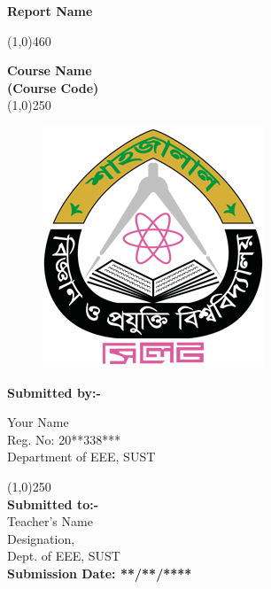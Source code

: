 \begin{titlepage}
	\begin{center}
	 \begin{Large}
	 \textbf{Report Name}
	 \end{Large}
	 \line(1,0){460}\\[5mm]
	 \begin{large} \textbf{ Course Name\\
	 (Course Code)}\\
	 	\line(1,0){250}
	 	\\[10mm]
	 \end{large}
	\end{center}
	

\begin{figure}[h]
\begin{center}
\includegraphics[scale=2.5]{logo/SUST_Logo.png}
\end{center}
\end{figure}

	\begin{center}
	\begin{large}
	
	\textbf{Submitted by:-}\\
\begin{center}
	 Your Name\\
	 Reg. No: 20**338***\\
	 Department of EEE, SUST\\
	[.3in]
\end{center}
	
	
	
	\line(1,0){250}
	\\[.5cm]
	\textbf{Submitted to:-}\\
	Teacher's Name\\
	Designation,\\
	Dept. of EEE, SUST\\[1cm]
	\textbf{Submission Date: **/**/****}
	\end{large}
	\end{center}
\end{titlepage}

\restoregeometry


